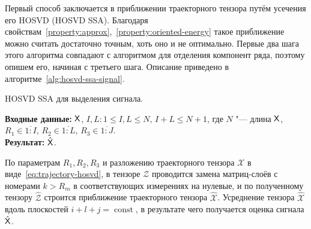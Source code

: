 \documentclass[specialist,
    substylefile = spbu_report.rtx,
    subf,href,colorlinks=true, 12pt]{disser}
\theoremstyle{plain}
\theoremstyle{definition}
\theoremstyle{remark}
\newcommand{\Input}{\textbf{Входные данные: }}
\newcommand{\Output}{\textbf{Результат: }}
\begin{document}
    Первый способ заключается в приближении траекторного тензора путём усечения его HOSVD (HOSVD SSA).
    Благодаря свойствам~\ref{property:approx},~\ref{property:oriented-energy} такое приближение можно считать достаточно точным,
    хоть оно и не оптимально.
    Первые два шага этого алгоритма совпадают с алгоритмом для отделения компонент ряда, поэтому опишем его, начиная с третьего шага.
    Описание приведено в алгоритме~\ref{alg:hosvd-ssa-signal}.

    \begin{algorithm}
        \caption{HOSVD SSA для выделения сигнала.}
        \label{alg:hosvd-ssa-signal}
        \Input $\mathsf{X}$, $I,L: 1\leqslant I,L \leqslant N,\, I + L \leqslant N + 1$, где $N$ "--- длина $\mathsf{X}$, $R_1 \in \overline{1:I}$,
        $R_2 \in \overline{1:L}$, $R_3 \in \overline{1:J}$.\\
        \Output $\hat{\mathsf{X}}$.

        \begin{algorithmic}[1]
            \State По параметрам $R_1, R_2, R_3$ и разложению траекторного тензора $\mathcal{X}$
            в виде~\eqref{eq:trajectory-hosvd},
            в тензоре $\mathcal{Z}$ проводится замена матриц-слоёв с номерами $k>R_m$ в соответствующих измерениях
            на нулевые, и по полученному тензору $\hat{\mathcal{Z}}$
            строится приближение траекторного тензора $\hat{\mathcal{X}}$.
            \State Усреднение тензора $\hat{\mathcal{X}}$ вдоль плоскостей $i+l+j=\operatorname{const}$,
            в результате чего получается оценка сигнала $\hat{\mathsf{X}}$.
        \end{algorithmic}
    \end{algorithm}
\end{document}
